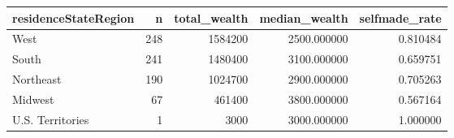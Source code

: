\begin{tabular}{lrrrr}
\toprule
residenceStateRegion & n & total\_wealth & median\_wealth & selfmade\_rate \\
\midrule
West & 248 & 1584200 & 2500.000000 & 0.810484 \\
South & 241 & 1480400 & 3100.000000 & 0.659751 \\
Northeast & 190 & 1024700 & 2900.000000 & 0.705263 \\
Midwest & 67 & 461400 & 3800.000000 & 0.567164 \\
U.S. Territories & 1 & 3000 & 3000.000000 & 1.000000 \\
\bottomrule
\end{tabular}
